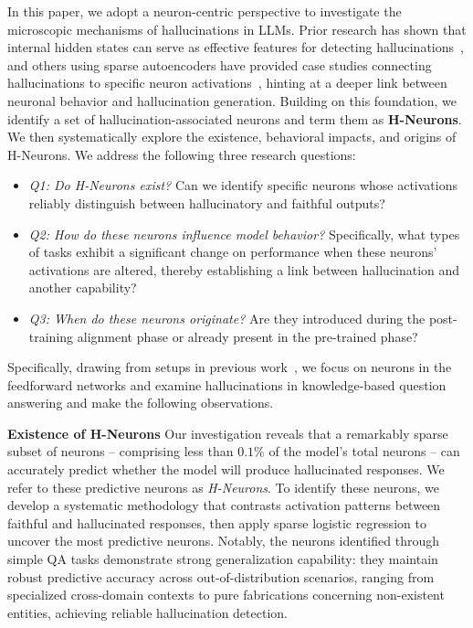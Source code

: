\documentclass[dvipsnames]{article}
\begin{document}
In this paper, we adopt a neuron-centric perspective to investigate the microscopic mechanisms of hallucinations in LLMs. Prior research has shown that internal hidden states can serve as effective features for detecting hallucinations~\citep{Internal_States}, and others using sparse autoencoders have provided case studies connecting hallucinations to specific neuron activations~\citep{anthropicSAE,SAEhallu}, hinting at a deeper link between neuronal behavior and hallucination generation. 
Building on this foundation, we identify a set of hallucination-associated neurons and term them as \textbf{H-Neurons}. We then systematically explore the existence, behavioral impacts, and origins of H-Neurons. We address the following three research questions:
\begin{itemize}[topsep=1pt,leftmargin=*]
    \item \textit{Q1: Do H-Neurons exist?} Can we identify specific neurons whose activations reliably distinguish between hallucinatory and faithful outputs?
    \item \textit{Q2: How do these neurons influence model behavior?} Specifically, what types of tasks exhibit a significant change on performance when these neurons' activations are altered, thereby establishing a link between hallucination and another capability?
    \item \textit{Q3: When do these neurons originate?} Are they introduced during the post-training alignment phase or already present in the pre-trained phase?
\end{itemize}

Specifically, drawing from setups in previous work~\citep{Finding_Safety_Neurons,Finding_Skill_Neurons,Detecting_hallu}, we focus on neurons in the feedforward networks and examine hallucinations in knowledge-based question answering and make the following observations.

\textbf{Existence of H-Neurons}\quad
Our investigation reveals that a remarkably sparse subset of neurons -- comprising less than $0.1\%$ of the model's total neurons -- can accurately predict whether the model will produce hallucinated responses. We refer to these predictive neurons as \textit{H-Neurons}.
To identify these neurons, we develop a systematic methodology that contrasts activation patterns between faithful and hallucinated responses, then apply sparse logistic regression to uncover the most predictive neurons. Notably, the neurons identified through simple QA tasks demonstrate strong generalization capability: they maintain robust predictive accuracy across out-of-distribution scenarios, ranging from specialized cross-domain contexts to pure fabrications concerning non-existent entities, achieving reliable hallucination detection.
\end{document}
